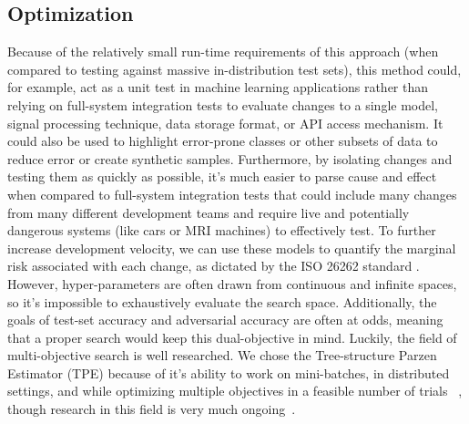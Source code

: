 \documentclass[conference]{IEEEtran}
\begin{document}


\subsection{Optimization}

Because of the relatively small run-time requirements of this approach (when compared to testing against massive in-distribution test sets), this method could, for example, act as a unit test in machine learning applications rather than relying on full-system integration tests to evaluate changes to a single model, signal processing technique, data storage format, or API access mechanism. It could also be used to highlight error-prone classes or other subsets of data to reduce error or create synthetic samples. Furthermore, by isolating changes and testing them as quickly as possible, it's much easier to parse cause and effect when compared to full-system integration tests that could include many changes from many different development teams and require live and potentially dangerous systems (like cars or MRI machines) to effectively test. To further increase development velocity, we can use these models to quantify the marginal risk associated with each change, as dictated by the ISO 26262 standard \cite{iso26262}. However, hyper-parameters are often drawn from continuous and infinite spaces, so it's impossible to exhaustively evaluate the search space. Additionally, the goals of test-set accuracy and adversarial accuracy are often at odds, meaning that a proper search would keep this dual-objective in mind. Luckily, the field of multi-objective search is well researched. We chose the Tree-structure Parzen Estimator (TPE) because of it's ability to work on mini-batches, in distributed settings, and while optimizing multiple objectives in a feasible number of trials ~\cite{ozaki2020multiobjective}, though research in this field is very much ongoing~\cite{ozaki2022multiobjective}.
\end{document}
